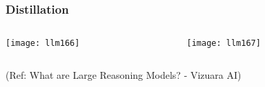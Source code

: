\begin{frame}[fragile]\frametitle{Distillation}


\begin{columns}
    \begin{column}[T]{0.5\linewidth}
		\begin{center}
		\texttt{[image: llm166]}
		\end{center}

    \end{column}
    \begin{column}[T]{0.5\linewidth}
		\begin{center}
		\texttt{[image: llm167]}
		\end{center}
    \end{column}
  \end{columns}
  

{\tiny (Ref: What are Large Reasoning Models? - Vizuara AI)}

\end{frame}

